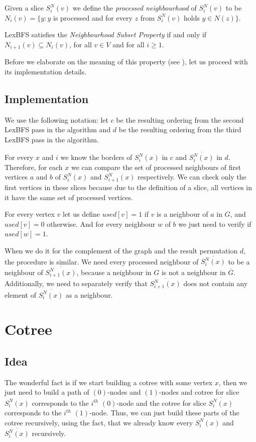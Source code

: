 \begin{definition}
    Given a slice $S^N_i(v)$ we define the \emph{processed neighbourhood} of $S^N_i(v)$ to be
$N_i(v) = \{y \colon y$ is processed and for every $z$ from $S^N_i(v)$ holds $y \in N(z)\}$.
\end{definition}

\begin{definition}
    LexBFS satisfies the \emph{Neighbourhood Subset Property} if and only if $N_{i+1}(v) \subseteq N_i(v)$, for all $v \in V$ and for all $i \geq 1$.
\end{definition}
Before we elaborate on the meaning of this property (see ), let us proceed with its implementation details.
\subsection{Implementation}
We use the following notation: let $c$ be the resulting ordering from the second LexBFS pass in the algorithm and $d$ be the resulting ordering from the third LexBFS pass in the algorithm.


For every $x$ and $i$ we know the borders of $S^N_i(x)$ in $c$ and $\overline{S^N_i(x)}$ in $d$. Therefore, for each $x$ we can compare the set of processed neighbours of first vertices $a$ and $b$ of $S^N_i(x)$ and $S^N_{i+1}(x)$ respectively. We can check only the first vertices in these slices because due to the definition of a slice, all vertices in it have the same set of processed vertices.

For every vertex $v$ let us define $used[v]=1$ if $v$ is a neighbour of $a$ in $G$, and $used[v]=0$ otherwise. And for every neighbour $w$ of $b$ we just need to verify if $used[w] = 1$.

When we do it for the complement of the graph and the result permutation $d$, the procedure is similar. We need every processed neighbour of $\overline{S^N_i(x)}$ to be a neighbour of $\overline{S^N_{i+1}(x)}$, because a neighbour in $G$ is not a neighbour in $\overline{G}$.
Additionally, we need to separately verify that $\overline{S^N_{i+1}(x)}$ does not contain any element of $\overline{S^N_i(x)}$ as a neighbour.

\section{Cotree}
\subsection{Idea}
The wonderful fact is if we start building a cotree with some vertex $x$, then we just need to build a path of $(0)$-nodes and $(1)$-nodes and cotree for slice $S^N_i(x)$ corresponds to the $i^{th}$ $(0)$-node and the cotree for slice $\overline{S^N_i(x)}$ corresponds to the 
$i^{th}$ $(1)$-node. Thus, we can just build these parts of the cotree recursively, using the fact, that we already know every $S^N_i(x)$ and $\overline{S^N_i(x)}$ recursively. 
